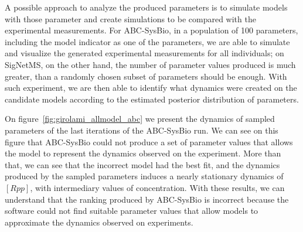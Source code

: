 A possible approach to analyze the produced parameters is to simulate
models with those parameter and create simulations to be compared with
the experimental measurements. For ABC-SysBio, in a population of 100
parameters, including the model indicator as one of the parameters, we
are able to simulate and visualize the generated experimental 
measurements for all individuals; on SigNetMS, on the other hand, the 
number of parameter values produced is much greater, than a randomly 
chosen subset of parameters should be enough. With such experiment, we 
are then able to identify what dynamics were created on the candidate 
models according to the estimated posterior distribution of parameters. 

On  figure~\ref{fig:girolami_allmodel_abc} we present the dynamics of 
sampled parameters of the last iterations of the ABC-SysBio run. We can
see on this figure that ABC-SysBio could not produce a set of parameter
values that allows the model to represent the dynamics observed on the
experiment. More than that, we can see that the incorrect model had the
best fit, and the dynamics produced by the sampled parameters induces a
nearly stationary dynamics of $[Rpp]$, with intermediary values of
concentration. With these results, we can understand that the ranking
produced by ABC-SysBio is incorrect because the software could not find
suitable parameter values that allow models to approximate the dynamics
observed on experiments.

